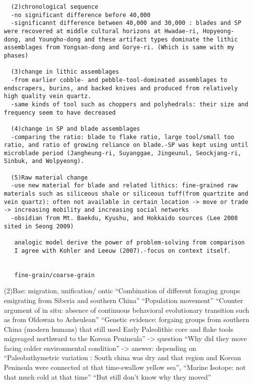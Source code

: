 \documentclass[american,man]{apa6}
\begin{document}
\begin{verbatim}
  (2)chronological sequence
  -no significant difference before 40,000
  -significannt difference between 40,000 and 30,000 : blades and SP were recovered at middle cultural horizons at Hwadae-ri, Hopyeong-dong, and Youngho-dong and these artifact types dominate the lithic assemblages from Yongsan-dong and Gorye-ri. (Which is same with my phases)
  
  (3)change in lithic assemblages
  -from earlier cobble- and pebble-tool-dominated assemblages to endscrapers, burins, and backed knives and produced from relatively high quality vein quartz. 
  -same kinds of tool such as choppers and polyhedrals: their size and frequency seem to have decreased
  
  (4)change in SP and blade assemblages
  -comparing the ratio: blade to flake ratio, large tool/small too ratio, and ratio of growing reliance on blade.-SP was kept using until microblade period (Jangheung-ri, Suyanggae, Jingeunul, Seockjang-ri, Sinbuk, and Wolpyeong).
  
  (5)Raw material change
  -use new material for blade and related lithics: fine-grained raw materials such as siliceous shale or siliceous tuff(from quartzite and vein quartz): often not available in certain location -> move or trade -> increasing mobility and increasing social networks
  -obsidian from Mt. Baekdu, Kyushu, and Hokkaido sources (Lee 2008 sited in Seong 2009)
  
   analogic model derive the power of problem-solving from comparison
   I agree with Kohler and Leeuw (2007).-focus on context itself.
   
   
   fine-grain/coarse-grain
\end{verbatim}

(2)Bae: migration, unification/ ontic \enquote{Combination of different
foraging groups emigrating from Siberia and southern China}
\enquote{Population movement} \enquote{Counter argument of in situ:
absence of continuous behavioral evolutionary transition such as from
Oldowan to Acheulean} \enquote{Genetic evidence: forgaing groups from
southern China (modern humans) that still used Early Paleolithic core
and flake tools migreaged northward to the Korean Peninsula}
-\textgreater{} question \enquote{Why did they move facing colder
environmental condition} -\textgreater{} answer: depending on
\enquote{Paleobathymetric variation : South china was dry and that
region and Korean Peninsula were connected at that time-swallow yellow
sea}, \enquote{Marine Isotope: not that much cold at that time}
\enquote{But still don't know why they moved}
\end{document}
